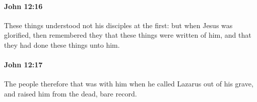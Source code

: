 		\paragraph{John 12:16} %
			\label{JOHN-12-16}

			These things understood not his disciples at the first: but when Jesus was glorified, then remembered they that these things were written of him, and that they had done these things unto him.

			\begin{framed}
				\scriptsize
				\begin{compactdesc}
					\item[SBLG] 
				\end{compactdesc}
			\end{framed}

		\paragraph{John 12:17} %
			\label{JOHN-12-17}

			The people therefore that was with him when he called Lazarus out of his grave, and raised him from the dead, bare record.


